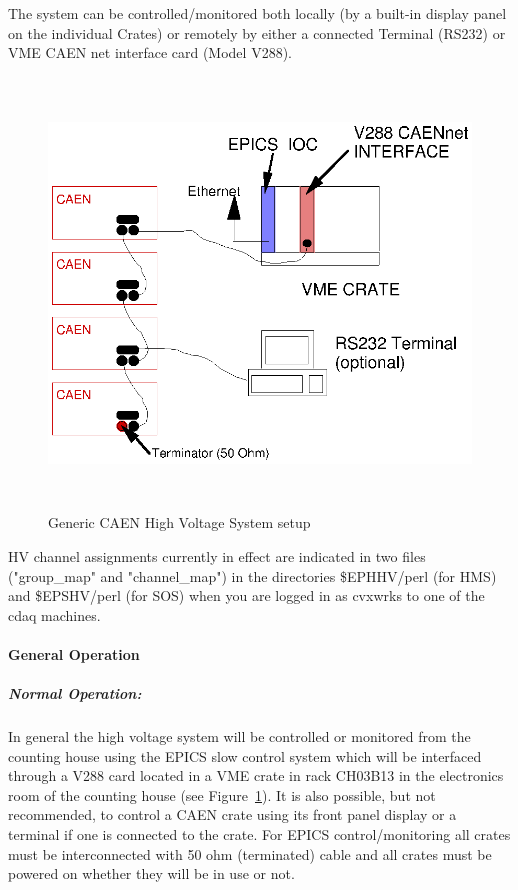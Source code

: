 The system can be controlled/monitored both locally (by a built-in
display panel on the individual Crates) or remotely by either a
connected Terminal (RS232) or VME CAEN net interface card (Model V288).


\begin{figure}
\includegraphics[height=4.5in]{detectors/CAENHV.ps}
\caption{Generic CAEN High Voltage System setup\label{fig:caen_setup}}
\end{figure}

HV channel assignments currently in effect are indicated in 
two files ("group\_map" and
"channel\_map") in the directories \$EPHHV/perl (for HMS) and \$EPSHV/perl (for
SOS) when you are logged in as cvxwrks to one of the cdaq machines.

\paragraph{General Operation}

\subparagraph{Normal Operation:}

In general the high voltage system will be controlled or monitored
from the counting house using the EPICS slow control system which will
be interfaced through a V288 card located in a VME crate in rack CH03B13
in the electronics room of the counting house
(see Figure~\ref{fig:caen_setup}).  It is also possible, but not recommended,
to control a CAEN crate using its front panel display or a terminal
if one is connected to the crate.
For EPICS control/monitoring all crates must be interconnected with 50
ohm (terminated) cable and all crates must be powered on whether they
will be in use or not.


